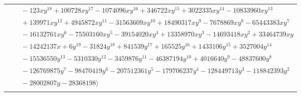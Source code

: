 \documentclass[11pt]{article}
\begin{document}
\begin{longtable}{@{}ll@{}}
 & $\quad -123xy^{18}+100728xy^{17}-1074096xy^{16}+346722xy^{15}+3022335xy^{14}-10833960xy^{13}$\\
 & $\quad +139971xy^{12}+4945872xy^{11}-31563609xy^{10}+18490317xy^{9}-7678869xy^{8}-65443383xy^{7}$\\
 & $\quad -16132761xy^{6}-75503160xy^{5}-39154020xy^{4}+13358970xy^{3}-14693418xy^{2}+33464739xy$\\
 & $\quad -14242137x+6y^{19}-31824y^{18}+841539y^{17}+165525y^{16}+1433106y^{15}+3527004y^{14}$\\
 & $\quad -15536550y^{13}-5310330y^{12}-3459876y^{11}-46387194y^{10}+4016640y^{9}-48837600y^{8}$\\
 & $\quad -126769875y^{7}-98470419y^{6}-207512361y^{5}-179706237y^{4}-128449713y^{3}-118842393y^{2}$\\
 & $\quad -28002807y-28368198\rangle$\\
\addlinespace[2pt]
\end{longtable}
\endgroup
\end{document}
